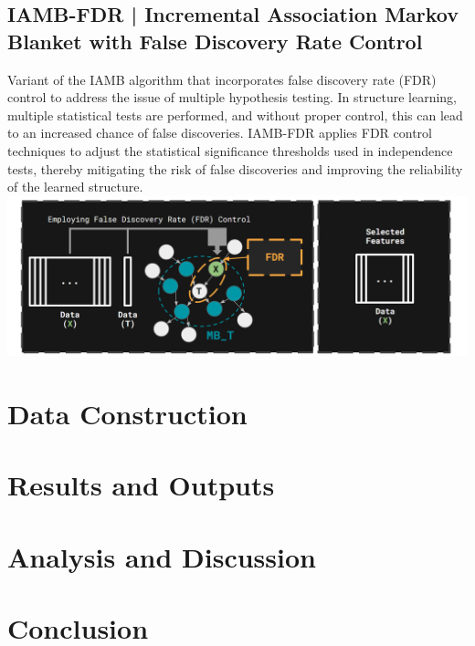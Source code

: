\documentclass{article}
\begin{document}
\subsection{IAMB-FDR | Incremental Association Markov Blanket with False Discovery Rate Control}
Variant of the IAMB algorithm that incorporates false discovery rate (FDR) control to address the issue of multiple hypothesis testing. 
In structure learning, multiple statistical tests are performed, and without proper control, this can lead to an increased chance of false discoveries. 
IAMB-FDR applies FDR control techniques to adjust the statistical significance thresholds used in independence tests, thereby mitigating the risk of false discoveries and improving the reliability of the learned structure.
\includegraphics[width=\textwidth,height=\textheight,keepaspectratio]{iambfdr.png}




\section{Data Construction}


\section{Results and Outputs}


\section{Analysis and Discussion}


\section{Conclusion}



\end{document}
